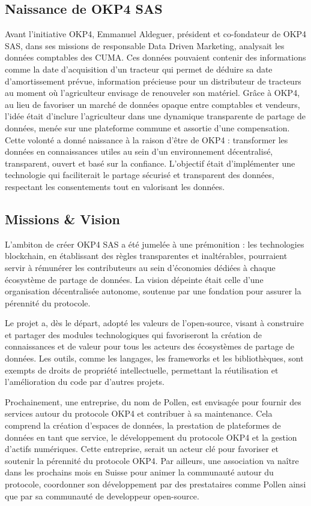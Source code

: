 \subsection{Naissance de OKP4 SAS} \label{subsec:geneis_okp4}
Avant l'initiative OKP4, Emmanuel Aldeguer, président et co-fondateur de OKP4 SAS, dans ses missions de responsable Data Driven Marketing, analysait les données comptables des CUMA. Ces données pouvaient contenir des informations comme la date d'acquisition d'un tracteur qui permet de déduire sa date d'amortissement prévue, information précieuse pour un distributeur de tracteurs au moment où l'agriculteur envisage de renouveler son matériel. Grâce à OKP4, au lieu de favoriser un marché de données opaque entre comptables et vendeurs, l'idée était d'inclure l'agriculteur dans une dynamique transparente de partage de données, menée sur une plateforme commune et assortie d'une compensation.
Cette volonté a donné naissance à la raison d'être de OKP4 : transformer les données en connaissances utiles au sein d'un environnement décentralisé, transparent, ouvert et basé sur la confiance. L'objectif était d'implémenter une technologie qui faciliterait le partage sécurisé et transparent des données, respectant les consentements tout en valorisant les données.


\subsection{Missions \& Vision} \label{subsec:missions_okp4}


L'ambiton de créer OKP4 SAS a été jumelée à une prémonition : les technologies blockchain, en établissant des règles transparentes et inaltérables, pourraient servir à rémunérer les contributeurs au sein d'économies dédiées à chaque écosystème de partage de données. La vision dépeinte était celle d'une organisation décentralisée autonome, soutenue par une fondation pour assurer la pérennité du protocole.

Le projet a, dès le départ, adopté les valeurs de l'open-source, visant à construire et partager des modules technologiques qui favoriseront la création de connaissances et de valeur pour tous les acteurs des écosystèmes de partage de données. Les outils, comme les langages, les frameworks et les bibliothèques, sont exempts de droits de propriété intellectuelle, permettant la réutilisation et l'amélioration du code par d'autres projets.

Prochainement, une entreprise, du nom de Pollen, est envisagée pour fournir des services autour du protocole OKP4 et contribuer à sa maintenance. Cela comprend la création d'espaces de données, la prestation de plateformes de données en tant que service, le développement du protocole OKP4 et la gestion d'actifs numériques. Cette entreprise, serait un acteur clé pour favoriser et soutenir la pérennité du protocole OKP4. Par ailleurs, une association va naître dans les prochains mois en Suisse pour animer la communauté autour du protocole, coordonner son développement par des prestataires comme Pollen ainsi que par sa communauté de developpeur open-source.

